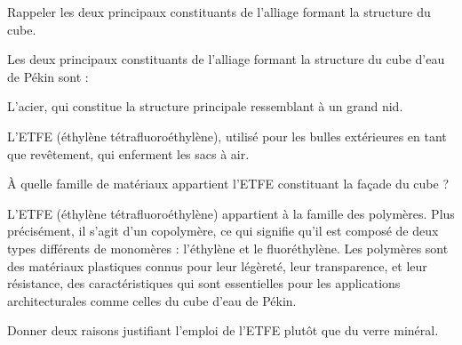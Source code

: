 \documentclass[answers]{exam}
\begin{document}
\begin{questions}
  \question[0.5] Rappeler les deux principaux constituants de l'alliage formant la structure du cube.
  

\begin{solution}
\begin{addmargin}[1em]{0em}
Les deux principaux constituants de l'alliage formant la structure du cube d'eau de Pékin sont :

\begin{compactitem}
\item L'acier, qui constitue la structure principale ressemblant à un grand nid.
\item L'ETFE (éthylène tétrafluoroéthylène), utilisé pour les bulles extérieures en tant que revêtement, qui enferment les sacs à air.
\end{compactitem}
\end{addmargin}
\end{solution}

\question[0.5] À quelle famille de matériaux appartient l'ETFE constituant la façade du cube ?
  

\begin{solution}
\begin{addmargin}[1em]{0em}
L'ETFE (éthylène tétrafluoroéthylène) appartient à la famille des polymères. Plus précisément, il s'agit d'un copolymère, ce qui signifie qu'il est composé de deux types différents de monomères : l'éthylène et le fluoréthylène. Les polymères sont des matériaux plastiques connus pour leur légèreté, leur transparence, et leur résistance, des caractéristiques qui sont essentielles pour les applications architecturales comme celles du cube d'eau de Pékin.
\end{addmargin}
\end{solution}

\question[0.5] Donner deux raisons justifiant l'emploi de l'ETFE plutôt que du verre minéral.
\end{questions}
\end{document}
